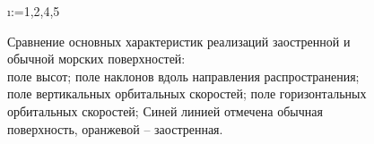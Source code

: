 \begin{figure}[h]
\centering
\makeatletter
    \@for\i:={1,2,4,5}

\label{fig:cwm_modeling}
\caption{
    Сравнение основных характеристик реализаций заостренной и обычной
    морских поверхностей: \\
     поле высот;
     поле наклонов вдоль направления
    распространения;
     поле вертикальных орбитальных скоростей;
     поле горизонтальных орбитальных скоростей;
    Синей линией отмечена обычная поверхность, оранжевой -- заостренная.
}
\makeatother
\end{figure}


